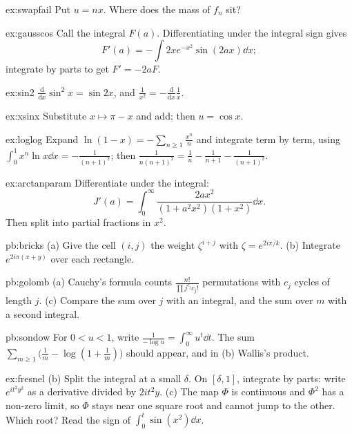 \begin{hint}{ex:swapfail}
Put $u=nx$. Where does the mass of $f_n$ sit?
\end{hint}
\begin{hint}{ex:gausscos}
Call the integral $F(a)$. Differentiating under the integral sign gives
\[
F'(a)=-\int2xe^{-x^2}\sin(2ax)\dd x;
\]
integrate by parts to get $F'=-2aF$.
\end{hint}
\begin{hint}{ex:sin2}
$\frac{\mathrm d}{\mathrm dx}\sin^2x=\sin2x$, and $\frac1{x^2}=-\frac{\mathrm d}{\mathrm dx}\frac1x$.
\end{hint}
\begin{hint}{ex:xsinx}
Substitute $x\mapsto\pi-x$ and add; then $u=\cos x$.
\end{hint}
\begin{hint}{ex:loglog}
Expand $\ln(1-x)=-\sum_{n\ge1}\frac{x^n}n$ and integrate term by term, using $\int_0^1x^n\ln x\dd x=-\frac1{(n+1)^2}$; then
$\frac1{n(n+1)^2}=\frac1n-\frac1{n+1}-\frac1{(n+1)^2}$.
\end{hint}
\begin{hint}{ex:arctanparam}
Differentiate under the integral:
\[
J'(a)=\int_0^\infty\frac{2ax^2}{(1+a^2x^2)(1+x^2)}\dd x.
\]
Then split into partial fractions in $x^2$.
\end{hint}

\begin{hint}{pb:bricks}
(a) Give the cell $(i,j)$ the weight $\zeta^{i+j}$ with $\zeta=e^{2i\pi/k}$. (b) Integrate $e^{2i\pi(x+y)}$ over each rectangle.
\end{hint}

\begin{hint}{pb:golomb}
(a) Cauchy's formula counts $\frac{n!}{\prod j^{c_j}c_j!}$ permutations with $c_j$ cycles of length $j$. (c) Compare the sum over $j$ with an integral, and the sum over $m$ with a second integral.
\end{hint}

\begin{hint}{pb:sondow}
For $0<u<1$, write $\frac1{-\log u}=\int_0^\infty u^t\dd t$. The sum $\sum_{m\ge1}\bigl(\frac1m-\log(1+\frac1m)\bigr)$ should appear, and in (b) Wallis's product.
\end{hint}

\begin{hint}{ex:fresnel}
(b) Split the integral at a small $\delta$. On $[\delta,1]$, integrate by parts: write $e^{it^2y^2}$ as a derivative divided by $2it^2y$. (c) The map $\Phi$ is continuous and $\Phi^2$ has a non-zero limit, so $\Phi$ stays near one square root and cannot jump to the other. Which root? Read the sign of $\int_0^t\sin(x^2)\dd x$.
\end{hint}

